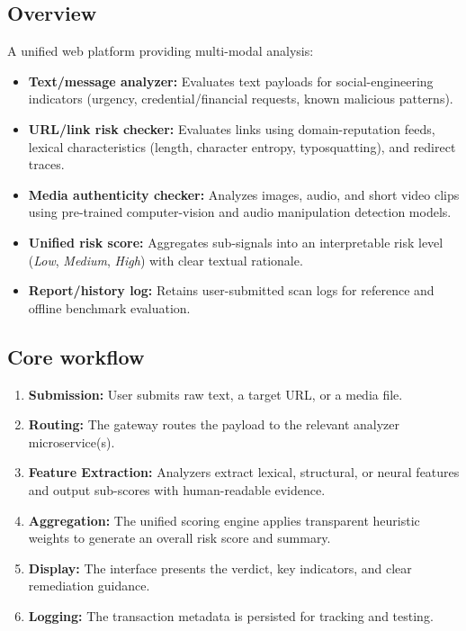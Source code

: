 \documentclass[11pt,a4paper]{article}
\begin{document}
\subsection{Overview}
A unified web platform providing multi-modal analysis:
\begin{itemize}[leftmargin=0.7cm]
    \item \textbf{Text/message analyzer:} Evaluates text payloads for social-engineering indicators (urgency, credential/financial requests, known malicious patterns).
    \item \textbf{URL/link risk checker:} Evaluates links using domain-reputation feeds, lexical characteristics (length, character entropy, typosquatting), and redirect traces.
    \item \textbf{Media authenticity checker:} Analyzes images, audio, and short video clips using pre-trained computer-vision and audio manipulation detection models.
    \item \textbf{Unified risk score:} Aggregates sub-signals into an interpretable risk level (\emph{Low}, \emph{Medium}, \emph{High}) with clear textual rationale.
    \item \textbf{Report/history log:} Retains user-submitted scan logs for reference and offline benchmark evaluation.
\end{itemize}

\subsection{Core workflow}
\begin{enumerate}[leftmargin=0.7cm]
    \item \textbf{Submission:} User submits raw text, a target URL, or a media file.
    \item \textbf{Routing:} The gateway routes the payload to the relevant analyzer microservice(s).
    \item \textbf{Feature Extraction:} Analyzers extract lexical, structural, or neural features and output sub-scores with human-readable evidence.
    \item \textbf{Aggregation:} The unified scoring engine applies transparent heuristic weights to generate an overall risk score and summary.
    \item \textbf{Display:} The interface presents the verdict, key indicators, and clear remediation guidance.
    \item \textbf{Logging:} The transaction metadata is persisted for tracking and testing.
\end{enumerate}
\end{document}

